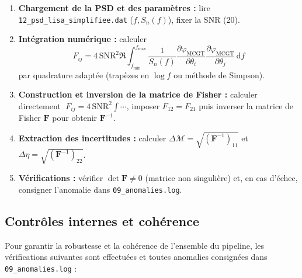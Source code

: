 \begin{enumerate}
  \item \textbf{Chargement de la PSD et des paramètres :}
  lire \texttt{12\_psd\_lisa\_simplifiee.dat} (\(f,S_{n}(f)\)), fixer la SNR (20).

  \item \textbf{Intégration numérique :}
    calculer
    \[
      F_{ij}
      =4\,\mathrm{SNR}^{2}
      \Re\!\int_{f_{\min}}^{f_{\max}}
        \frac{1}{S_{n}(f)}
        \frac{\partial\varphi_{\mathrm{MCGT}}}{\partial\theta_{i}}
        \frac{\partial\varphi_{\mathrm{MCGT}}}{\partial\theta_{j}}
      \,\mathrm{d}f
    \]
    par quadrature adaptée (trapèzes en \(\log f\) ou méthode de Simpson).

  \item \textbf{Construction et inversion de la matrice de Fisher :}
  calculer directement
  \(\;F_{ij}=4\,\mathrm{SNR}^{2}\!\int\!\cdots\), imposer \(F_{12}=F_{21}\)
  puis inverser la matrice de Fisher \(\mathbf{F}\) pour obtenir \(\mathbf{F}^{-1}\).

  \item \textbf{Extraction des incertitudes :}
    calculer
    \(\Delta\mathcal{M}=\sqrt{(\mathbf{F}^{-1})_{11}}\) et
    \(\Delta\eta=\sqrt{(\mathbf{F}^{-1})_{22}}\).

  \item \textbf{Vérifications :}
  vérifier \(\det\mathbf{F}\neq0\) (matrice non singulière) et, en cas d’échec,
  consigner l’anomalie dans \texttt{09\_anomalies.log}.
\end{enumerate}

\subsection{Contrôles internes et cohérence}
Pour garantir la robustesse et la cohérence de l’ensemble du pipeline, les vérifications suivantes sont effectuées et toutes anomalies consignées dans \texttt{09\_anomalies.log} :

